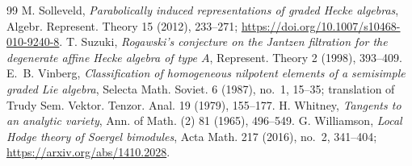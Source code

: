 \documentclass[10pt,a4paper]{amsart}
\begin{document}
\begin{thebibliography}{99}
 M. Solleveld, \emph{Parabolically induced representations of graded Hecke algebras}, Algebr. Represent. Theory 15 (2012), 233--271; \url{https://doi.org/10.1007/s10468-010-9240-8}.
 T. Suzuki, \emph{Rogawski's conjecture on the Jantzen filtration for the degenerate affine Hecke algebra of type $A$}, Represent. Theory 2 (1998), 393--409.
 E.~B. Vinberg, \emph{Classification of homogeneous nilpotent elements of a semisimple graded Lie algebra}, Selecta Math. Soviet. 6 (1987), no.~1, 15--35; translation of Trudy Sem. Vektor. Tenzor. Anal. 19 (1979), 155--177.
 H. Whitney, \emph{Tangents to an analytic variety}, Ann. of Math. (2) 81 (1965), 496--549.
 G. Williamson, \emph{Local Hodge theory of Soergel bimodules}, Acta Math. 217 (2016), no.~2, 341--404; \url{https://arxiv.org/abs/1410.2028}.
\end{thebibliography}
\end{document}

